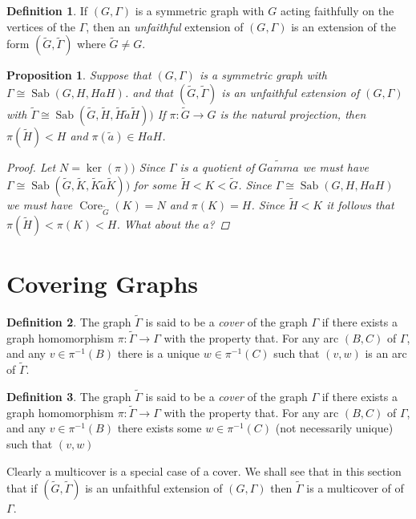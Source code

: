 \documentclass[12pt]{amsart}
\theoremstyle{plain}
\newtheorem{proposition}{Proposition}
\theoremstyle{definition}
\newtheorem{definition}{Definition}
\theoremstyle{remark}
\DeclareMathOperator{\core}{Core}
\DeclareMathOperator{\sab}{Sab}
\newcommand{\wt}[1]{\widetilde{#1}}
\begin{document}
\begin{definition}
If $(G,\Gamma)$ is a symmetric graph with $G$ acting faithfully on the vertices
of the $\Gamma$, then an {\it unfaithful} extension of $(G,\Gamma)$
is an extension of the form $(\widetilde{G},\widetilde{\Gamma})$
where $\widetilde{G} \neq G$. 
\end{definition}


\begin{proposition}
Suppose that $(G,\Gamma)$ is a symmetric graph with
$\Gamma \cong \sab(G,H,HaH)$.
and that $(\wt{G},\wt{\Gamma})$ is an unfaithful extension
of $(G,\Gamma)$ with
$\wt{\Gamma} \cong 
\sab(\wt{G},\wt{H},\wt{H}\wt{a}\wt{H}))$
If $\pi : \wt{G} \to G$ is the natural projection, then
$\pi(\wt{H}) < H$ and $\pi(\wt{a}) \in HaH$.
\begin{proof}
Let $N = \ker(\pi))$
Since $\Gamma$ is a quotient of $\wt{Gamma}$
we must have 
$\Gamma \cong \sab(\wt{G},\wt{K},\wt{K}\wt{a}\wt{K}))$
for some $\wt{H} < K < \wt{G}$.
Since $\Gamma \cong \sab(G,H,HaH)$
we must have $\core_{\wt{G}}(K) = N$
and $\pi(K) = H$.
Since $\wt{H} < K$ it follows that $\pi(\wt{H}) < \pi(K) < H$.
What about the $a$?
\end{proof}

\end{proposition}

\section{Covering Graphs}

\begin{definition}
The graph $\widetilde{\Gamma}$ is said to be a {\it cover}
of the graph $\Gamma$ if there exists a graph homomorphism
$\pi : \widetilde{\Gamma} \to \Gamma$ with the property that.
For any arc $(B,C)$ of $\Gamma$, and any $v \in \pi^{-1}(B)$
there is a unique $w \in \pi^{-1}(C)$ such that $(v,w)$
is an arc of $\widetilde{\Gamma}$.
\end{definition}

\begin{definition}
The graph $\widetilde{\Gamma}$ is said to be a {\it cover}
of the graph $\Gamma$ if there exists a graph homomorphism
$\pi : \widetilde{\Gamma} \to \Gamma$ with the property that.
For any arc $(B,C)$ of $\Gamma$, and any $v \in \pi^{-1}(B)$
there exists some $w \in \pi^{-1}(C)$ 
(not necessarily unique) such that $(v,w)$
\end{definition}

Clearly a multicover is a special case of a cover.
We shall see that in this section
that if $(\widetilde{G},\widetilde{\Gamma})$
is an unfaithful extension of $(G,\Gamma)$ then
$\widetilde{\Gamma}$ is a multicover of of $\Gamma$.
\end{document}

